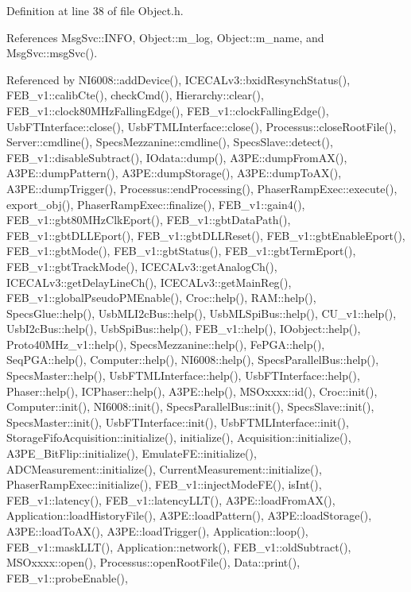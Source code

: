 Definition at line 38 of file Object.\+h.



References Msg\+Svc\+::\+I\+N\+FO, Object\+::m\+\_\+log, Object\+::m\+\_\+name, and Msg\+Svc\+::msg\+Svc().



Referenced by N\+I6008\+::add\+Device(), I\+C\+E\+C\+A\+Lv3\+::bxid\+Resynch\+Status(), F\+E\+B\+\_\+v1\+::calib\+Cte(), check\+Cmd(), Hierarchy\+::clear(), F\+E\+B\+\_\+v1\+::clock80\+M\+Hz\+Falling\+Edge(), F\+E\+B\+\_\+v1\+::clock\+Falling\+Edge(), Usb\+F\+T\+Interface\+::close(), Usb\+F\+T\+M\+L\+Interface\+::close(), Processus\+::close\+Root\+File(), Server\+::cmdline(), Specs\+Mezzanine\+::cmdline(), Specs\+Slave\+::detect(), F\+E\+B\+\_\+v1\+::disable\+Subtract(), I\+Odata\+::dump(), A3\+P\+E\+::dump\+From\+A\+X(), A3\+P\+E\+::dump\+Pattern(), A3\+P\+E\+::dump\+Storage(), A3\+P\+E\+::dump\+To\+A\+X(), A3\+P\+E\+::dump\+Trigger(), Processus\+::end\+Processing(), Phaser\+Ramp\+Exec\+::execute(), export\+\_\+obj(), Phaser\+Ramp\+Exec\+::finalize(), F\+E\+B\+\_\+v1\+::gain4(), F\+E\+B\+\_\+v1\+::gbt80\+M\+Hz\+Clk\+Eport(), F\+E\+B\+\_\+v1\+::gbt\+Data\+Path(), F\+E\+B\+\_\+v1\+::gbt\+D\+L\+L\+Eport(), F\+E\+B\+\_\+v1\+::gbt\+D\+L\+L\+Reset(), F\+E\+B\+\_\+v1\+::gbt\+Enable\+Eport(), F\+E\+B\+\_\+v1\+::gbt\+Mode(), F\+E\+B\+\_\+v1\+::gbt\+Status(), F\+E\+B\+\_\+v1\+::gbt\+Term\+Eport(), F\+E\+B\+\_\+v1\+::gbt\+Track\+Mode(), I\+C\+E\+C\+A\+Lv3\+::get\+Analog\+Ch(), I\+C\+E\+C\+A\+Lv3\+::get\+Delay\+Line\+Ch(), I\+C\+E\+C\+A\+Lv3\+::get\+Main\+Reg(), F\+E\+B\+\_\+v1\+::global\+Pseudo\+P\+M\+Enable(), Croc\+::help(), R\+A\+M\+::help(), Specs\+Glue\+::help(), Usb\+M\+L\+I2c\+Bus\+::help(), Usb\+M\+L\+Spi\+Bus\+::help(), C\+U\+\_\+v1\+::help(), Usb\+I2c\+Bus\+::help(), Usb\+Spi\+Bus\+::help(), F\+E\+B\+\_\+v1\+::help(), I\+Oobject\+::help(), Proto40\+M\+Hz\+\_\+v1\+::help(), Specs\+Mezzanine\+::help(), Fe\+P\+G\+A\+::help(), Seq\+P\+G\+A\+::help(), Computer\+::help(), N\+I6008\+::help(), Specs\+Parallel\+Bus\+::help(), Specs\+Master\+::help(), Usb\+F\+T\+M\+L\+Interface\+::help(), Usb\+F\+T\+Interface\+::help(), Phaser\+::help(), I\+C\+Phaser\+::help(), A3\+P\+E\+::help(), M\+S\+Oxxxx\+::id(), Croc\+::init(), Computer\+::init(), N\+I6008\+::init(), Specs\+Parallel\+Bus\+::init(), Specs\+Slave\+::init(), Specs\+Master\+::init(), Usb\+F\+T\+Interface\+::init(), Usb\+F\+T\+M\+L\+Interface\+::init(), Storage\+Fifo\+Acquisition\+::initialize(), initialize(), Acquisition\+::initialize(), A3\+P\+E\+\_\+\+Bit\+Flip\+::initialize(), Emulate\+F\+E\+::initialize(), A\+D\+C\+Measurement\+::initialize(), Current\+Measurement\+::initialize(), Phaser\+Ramp\+Exec\+::initialize(), F\+E\+B\+\_\+v1\+::inject\+Mode\+F\+E(), is\+Int(), F\+E\+B\+\_\+v1\+::latency(), F\+E\+B\+\_\+v1\+::latency\+L\+L\+T(), A3\+P\+E\+::load\+From\+A\+X(), Application\+::load\+History\+File(), A3\+P\+E\+::load\+Pattern(), A3\+P\+E\+::load\+Storage(), A3\+P\+E\+::load\+To\+A\+X(), A3\+P\+E\+::load\+Trigger(), Application\+::loop(), F\+E\+B\+\_\+v1\+::mask\+L\+L\+T(), Application\+::network(), F\+E\+B\+\_\+v1\+::old\+Subtract(), M\+S\+Oxxxx\+::open(), Processus\+::open\+Root\+File(), Data\+::print(), F\+E\+B\+\_\+v1\+::probe\+Enable(), 
